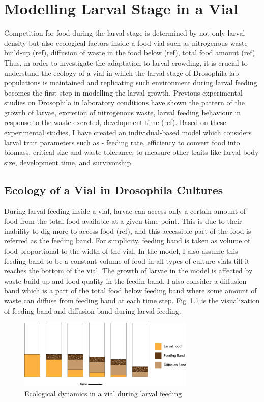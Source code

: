 \chapter{Modelling Larval Stage in a Vial}
Competition for food during the larval stage is determined by not only larval density but also ecological factors inside a food vial such as nitrogenous waste build-up (ref), diffusion of waste in the food below (ref), total food amount (ref). Thus, in order to investigate the adaptation to larval crowding, it is crucial to understand the ecology of a vial in which the larval stage of Drosophila lab populations is maintained and replicating such environment during larval feeding becomes the first step in modelling the larval growth. Previous experimental studies on Drosophila in laboratory conditions have shown the pattern of the growth of larvae, excretion of nitrogenous waste, larval feeding behaviour in response to the waste excreted, development time (ref). Based on these experimental studies, I have created an individual-based model which considers larval trait parameters such as - feeding rate, efficiency to convert food into biomass, critical size and waste tolerance, to measure other traits like larval body size, development time, and survivorship.
\section{Ecology of a Vial in Drosophila Cultures}
During larval feeding inside a vial, larvae can access only a certain amount of food from the total food available at a given time point. This is due to their inability to dig more to access food (ref), and this accessible part of the food is referred as the feeding band. For simplicity, feeding band is taken as volume of food proportional to the width of the vial. In the model, I also assume this feeding band to be a constant volume of food in all types of culture vials till it reaches the bottom of the vial. The growth of larvae in the model is affected by waste build up and food quality in the feedin band. I also consider a diffusion band which is a part of the total food below feeding band where some amount of waste can diffuse from feeding band at each time step. Fig~\ref{fig:vial} is the visualization of feeding band and diffusion band during larval feeding.

\begin{figure}[h]
  \centering
  \includegraphics[width=0.75\textwidth]{C2/Figs/vial_diagram.png}
  \caption{Ecological dynamics in a vial during larval feeding}
  \label{fig:vial}
\end{figure}

